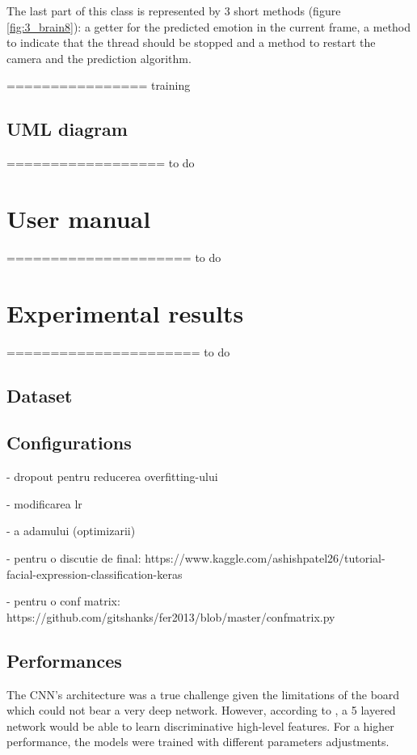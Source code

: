 \documentclass[runningheads,a4paper,12pt]{report}
\begin{document}
The last part of this class is represented by 3 short methods (figure \ref{fig:3_brain8}): a getter for the predicted emotion in the current frame, a method to indicate that the thread should be stopped and a method to restart the camera and the prediction algorithm.

================ training

\subsection*{UML diagram}

================== to do

\section{User manual}
\label{chapter:manual}
===================== to do

\section{Experimental results}
\label{chapter:results}

====================== to do

\subsection{Dataset}
\label{chapter:dataset}


\subsection{Configurations}
\label{chapter:configurations}
- dropout pentru reducerea overfitting-ului

- modificarea lr

- a adamului (optimizarii)

- pentru o discutie de final: https://www.kaggle.com/ashishpatel26/tutorial-facial-expression-classification-keras

- pentru o conf matrix: https://github.com/gitshanks/fer2013/blob/master/confmatrix.py

\subsection{Performances}
\label{chapter:performances}
The CNN's architecture was a true challenge given the limitations of the board which could not bear a very deep network. However, according to \cite{fer-cnn}, a 5 layered network would be able to learn discriminative high-level features. For a higher performance, the models were trained with different parameters adjustments. 
\end{document}
